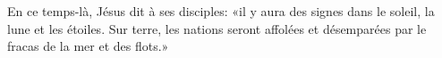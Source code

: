 En ce temps-là, Jésus dit à ses disciples:
«il y aura des signes dans le soleil, la lune et les étoiles. Sur terre, les nations seront affolées et désemparées par le fracas de la mer et des flots.»